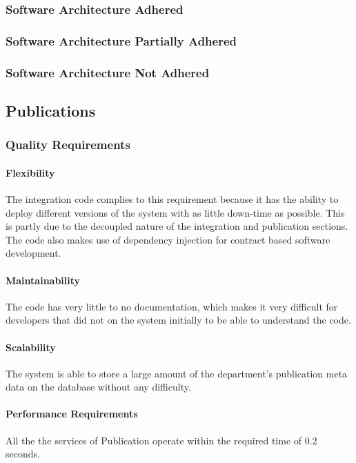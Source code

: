 \documentclass{article}
\begin{document}
        \subsubsection{Software Architecture Adhered}
        \subsubsection{Software Architecture Partially Adhered}
        \subsubsection{Software Architecture Not Adhered}       
        
    \subsection{Publications}
    	\subsubsection{Quality Requirements}
    		\paragraph{Flexibility}
            The integration code complies to this requirement because it has the ability to deploy different versions of the system with as little down-time as possible. This is partly due to the decoupled nature of the integration and publication sections. The code also makes use of dependency injection for contract based software development.
    
            \paragraph{Maintainability}
            The code has very little to no documentation, which makes it very difficult for developers that did not on the system initially to be able to understand the code.
            
            \paragraph{Scalability}
            The system is able to store a large amount of the department's publication meta data on the database without any difficulty.
            
            \paragraph{Performance Requirements}
            All the the services of Publication operate within the required time of 0.2 seconds.
            
\end{document}
